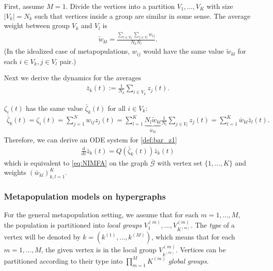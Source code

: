 \documentclass{article}
\renewcommand{\d}{\mathrm{d}}
\newcommand{\1}[1]{{\mathds{1}}_{\left\{#1\right\}}}
\begin{document}
	First, assume $M=1$. Divide the vertices into a partition $V_1,\dots,V_{K}$  with size $\left|V_k\right|=N_k$ such that vertices inside a group are similar in some sense. The average weight between group $V_k$ and $V_l$ is
	\begin{align}
		\label{def:tilde_w1}
		\tilde{w}_{kl}=\frac{\sum_{i \in V_k}\sum_{j \in V_l} w_{ij}}{N_k N_l}.
	\end{align}
	(In the idealized case of metapopulations, $w_{ij}$ would have the same value $\tilde{w}_{kl}$ for each $i \in V_k, j \in V_l$ pair.)
	
	Next we derive the dynamics for the averages
	\begin{align}
		\label{def:bar_z1}
		\bar{z}_{k}(t):=\frac{1}{N_k}\sum_{i \in V_k}  z_{j}(t).
	\end{align}
	
	$\zeta_i(t)$ has the same value $\bar{\zeta}_k(t)$ for all $i \in V_k$:
	\begin{align}
		\label{def:pre_theta1}
		\bar{\zeta}_{k}(t)=\zeta_{i}(t)=\sum_{j=1}^N w_{ij}z_{j}(t)= \sum_{l=1}^K \underbrace{N_l\tilde{w}_{kl}}_{\bar{w}_{kl}} \frac{1}{N_l}\sum_{j \in V_l}z_j(t)=\sum_{l=1}^K \bar{w}_{kl}\bar{z}_l(t).
	\end{align}
	Therefore, we can derive an ODE system for \eqref{def:bar_z1} 
	\begin{align}
		\label{eq:meta_NIFMA}
		\frac{\d}{\d t}\bar{z}_k(t)=Q\left(\bar{\zeta}_k(t) \right)\bar{z}_{k}(t)
	\end{align}
	which is equivalent to \eqref{eq:NIMFA} on the graph $\overline{\mathcal{G}}$ with vertex set $\{1, \dots, K\}$ and weights $\left(\bar{w}_{kl}\right)_{k,l=1}^K.$
	
	
	
	\subsubsection{Metapopulation models on hypergraphs}
	\label{sss: metahypergraph}
	
	For the general metapopulation setting, we assume that for each $m=1,\dots,M$, the population is partitioned into \emph{local groups} $V_1^{(m)},\dots,V_{K^{(m)}}^{(m)}$. The \emph{type} of a vertex will be denoted by $k=\left(k^{(1)}, \dots, k^{(M)} \right)$, which means that for each $m=1,\dots,M$, the given vertex is in the local group $V_{k^{(m)}}^{(m)}$. Vertices can be partitioned according to their type into $\prod_{m=1}^M K^{(m)}$ \emph{global groups}.
	
\end{document}
